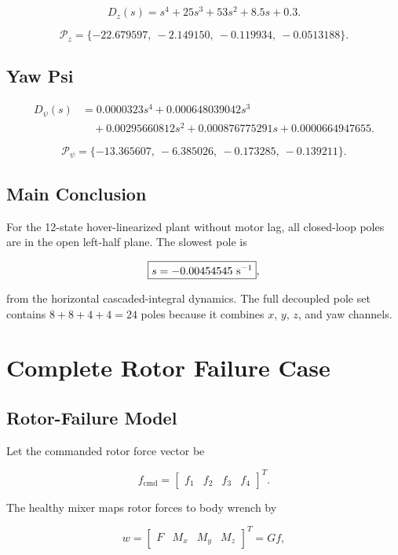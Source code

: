 \documentclass[11pt]{article}
\begin{document}
\[
D_z(s)=s^4+25s^3+53s^2+8.5s+0.3.
\]

\[
\boxed{
\mathcal{P}_{z}
=
\{-22.679597,\ -2.149150,\ -0.119934,\ -0.0513188\}.
}
\]

\subsection{Yaw Psi}

\[
\begin{aligned}
D_{\psi}(s)
&=
0.0000323s^4
+0.000648039042s^3\\
&\quad
+0.00295660812s^2
+0.000876775291s
+0.0000664947655.
\end{aligned}
\]

\[
\boxed{
\mathcal{P}_{\psi}
=
\{-13.365607,\ -6.385026,\ -0.173285,\ -0.139211\}.
}
\]

\subsection{Main Conclusion}

For the 12-state hover-linearized plant without motor lag, all closed-loop
poles are in the open left-half plane. The slowest pole is

\[
\boxed{s=-0.00454545\ {\rm s}^{-1}},
\]

from the horizontal cascaded-integral dynamics. The full decoupled pole set
contains \(8+8+4+4=24\) poles because it combines \(x\), \(y\), \(z\), and yaw
channels.

\section{Complete Rotor Failure Case}
\label{sec:rotor-failure}

\subsection{Rotor-Failure Model}

Let the commanded rotor force vector be

\[
f_{\mathrm{cmd}}=
\begin{bmatrix}f_1&f_2&f_3&f_4\end{bmatrix}^{T}.
\]

The healthy mixer maps rotor forces to body wrench by

\[
w =
\begin{bmatrix}F&M_x&M_y&M_z\end{bmatrix}^{T}
=G f,
\]
\end{document}

